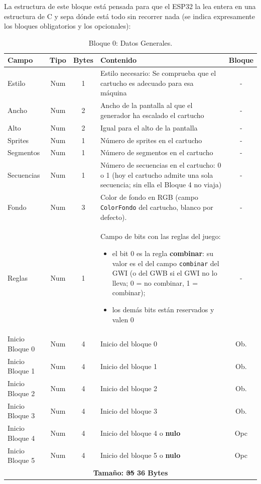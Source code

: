 La estructura de este bloque está pensada para que el ESP32 la lea entera en una
estructura de C y sepa dónde está todo sin recorrer nada (se indica expresamente los bloques obligatorios y los opcionales):

\begin{table}[H]
	\centering
	\begin{tabular}{|l|c|c|p{7.4cm}|c|}
		\hline
		\textbf{Campo} & \textbf{Tipo} & \textbf{Bytes} & \textbf{Contenido} & \textbf{Bloque} \\
		\hline
		
		Estilo & Num & 1 & Estilo necesario: Se comprueba que el cartucho es adecuado para esa máquina & -  \\ \hline
		Ancho & Num & 2 & Ancho de la pantalla al que el generador ha escalado el cartucho & -  \\ \hline
		Alto & Num & 2 & Igual para el alto de la pantalla & -  \\ \hline
		Sprites & Num & 1 & Número de sprites en el cartucho & -  \\ \hline
		Segmentos & Num & 1 & Número de segmentos en el cartucho & -  \\ \hline
		Secuencias & Num & 1 & Número de secuencias en el cartucho: 0 o 1 (hoy el cartucho admite una sola secuencia; sin ella el Bloque 4 no viaja) & - \\ \hline
		Fondo & Num & 3 & Color de fondo en RGB (campo \texttt{ColorFondo} del cartucho, blanco por defecto)\footnotemark. & - \\ \hline
		Reglas & Num & 1 & Campo de bits con las reglas del juego:
		\begin{itemize}
			\item  el bit 0 es la regla \textbf{combinar}: su valor es el del campo \texttt{combinar} del GWI (o del GWB si el GWI no lo lleva; 0 = no combinar, 1 = combinar);
			\item los demás bits están reservados y valen 0\footnotemark
		\end{itemize} & - \\ \hline
		Inicio Bloque 0 & Num & 4 & Inicio del bloque 0 & Ob. \\ \hline
		Inicio Bloque 1 & Num & 4 & Inicio del bloque 1 & Ob. \\ \hline
		Inicio Bloque 2 & Num & 4 & Inicio del bloque 2 & Ob. \\ \hline
		Inicio Bloque 3 & Num & 4 & Inicio del bloque 3 & Ob. \\ \hline
		Inicio Bloque 4 & Num & 4 & Inicio del bloque 4 o \textbf{nulo} & Opc \\ \hline
		Inicio Bloque 5 & Num & 4 & Inicio del bloque 5 o \textbf{nulo} & Opc \\
		
		\hline\hline
		\multicolumn{5}{c}{\textbf{Tamaño: \sout{35} 36 Bytes}} \\ \hline
	\end{tabular}
	\caption{Bloque 0: Datos Generales.}
	\label{tab:A02Bloque0}
\end{table}

